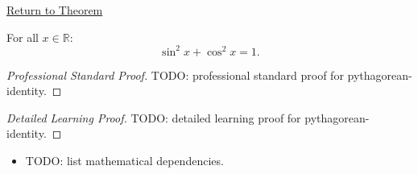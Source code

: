 \newpage
{}
\label{prf:pythagorean-identity}

\begin{remark*}[Return]
\hyperref[prop:pythagorean-identity]{Return to Theorem}
\end{remark*}

\begin{proposition*}
For all $x \in \mathbb{R}$:
\[
  \sin^2 x + \cos^2 x = 1.
\]

\smallskip\noindent
\end{proposition*}

\begin{proof}[Professional Standard Proof]
\LRAProofBodyStart
TODO: professional standard proof for pythagorean-identity.
\end{proof}

\begin{proof}[Detailed Learning Proof]
\LRAProofBodyStart
TODO: detailed learning proof for pythagorean-identity.
\end{proof}

\begin{remark*}
\end{remark*}

\begin{dependencies}
\begin{itemize}
  \item TODO: list mathematical dependencies.
\end{itemize}
\end{dependencies}

\clearpage
